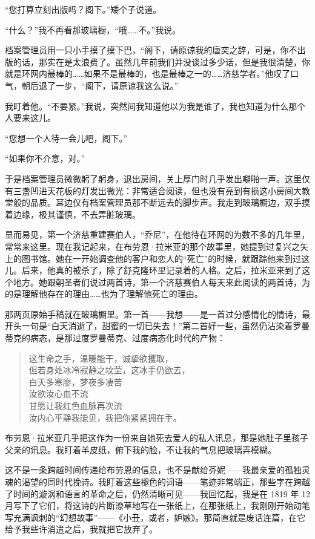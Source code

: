 \documentclass[AutoFakeBold=true]{book}
\begin{document}
``您打算立刻出版吗？阁下。''矮个子说道。

``什么？''我不再看那玻璃橱，``哦……不。''我说。

档案管理员用一只小手摸了摸下巴，``阁下，请原谅我的唐突之辞，可是，你不出版的话，那实在是太浪费了。虽然几年前我们并没谈过多少话，但是我很清楚，你就是环网内最棒的……如果不是最棒的，也是最棒之一的……济慈学者。''他叹了口气，朝后退了一步，``阁下，请原谅我这么说。''

我盯着他。``不要紧。''我说，突然间我知道他以为我是谁了，我也知道为什么那个人要来这儿。

``您想一个人待一会儿吧，阁下。''

``如果你不介意，对。''

于是档案管理员微微躬了躬身，退出房间，关上厚门时几乎发出噼啪一声。这里仅有三盏凹进天花板的灯发出微光：非常适合阅读，但也没有亮到有损这小房间大教堂般的品质。耳边仅有档案管理员那不断远去的脚步声。我走到玻璃橱边，双手摸着边缘，极其谨慎，不去弄脏玻璃。

显而易见，第一个济慈重建赛伯人，``乔尼''，在他待在环网的为数不多的几年里，常常来这里。现在我记起来，在布劳恩·拉米亚的那个故事里，她提到过复兴之矢上的图书馆。她在一开始调查他的客户和恋人的``死亡''的时候，就跟踪他来到过这儿。后来，他真的被杀了，除了舒克隆环里记录着的人格。之后，拉米亚来到了这个地方。她跟朝圣者们说过两首诗，第一个济慈赛伯人每天来此阅读的两首诗，为的是理解他存在的理由……也为了理解他死亡的理由。

那两页原始手稿就在玻璃橱里。第一首——我想——是一首过分感情化的情诗，最开头一句是``白天消逝了，甜蜜的一切已失去！''第二首好一些，虽然仍沾染着罗曼蒂克的病态，是那过度罗曼蒂克、过度病态化时代的产物：

\begin{quote}
	{\kaishu 这生命之手，温暖能干，诚挚欲攫取，\\
	但若身处冰冷寂静之坟茔，这冰手仍欲去，\\
	白天多寒廖，梦夜多凄苦\\
	汝欲汝心血不流\\
	甘愿让我红色血脉再次流\\
	汝内心平静我能见，我把你紧紧拥在手。}
\end{quote}

布劳恩·拉米亚几乎把这作为一份来自她死去爱人的私人讯息，那是她肚子里孩子父亲的讯息。我盯着羊皮纸，俯下我的脸，不让我的气息把玻璃弄模糊。

这不是一条跨越时间传递给布劳恩的信息，也不是献给芬妮——我最亲爱的孤独灵魂的渴望的同时代挽诗。我盯着这些褪色的词语——笔迹非常端正，那些字在跨越了时间的漩涡和语言的革命之后，仍然清晰可见——我回忆起，我是在 1819 年 12 月写下了它们，将这诗的片断潦草地写在一张纸上，在那张纸上，我刚刚开始动笔写充满讽刺的``幻想故事''——《小丑，或者，妒嫉》。那简直就是废话连篇，在它给予我些许消遣之后，我就把它放弃了。
\end{document}
